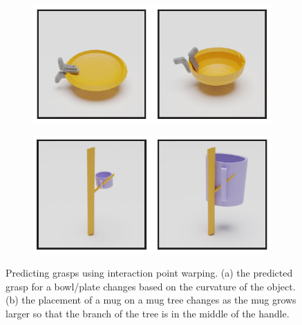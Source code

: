 \documentclass{article}
\newcommand{\pcx}[1]{\mathrm{X}^{(#1)}}
\begin{document}
\begin{figure}
    \centering
    \begin{subfigure}[b]{0.48\textwidth}
        \centering
        \includegraphics[width=\textwidth]{figures/picks_and_places_1.pdf}
        \caption{}
    \end{subfigure}
    \begin{subfigure}[b]{0.48\textwidth}
        \centering
        \includegraphics[width=\textwidth]{figures/picks_and_places_2.pdf}
        \caption{}
    \end{subfigure}
    \caption{Predicting grasps using interaction point warping. (a) the predicted grasp for a bowl/plate changes based on the curvature of the object. (b) the placement of a mug on a mug tree changes as the mug grows larger so that the branch of the tree is in the middle of the handle.}
    \label{fig:grasps_and_placements}
\end{figure}

\end{document}
